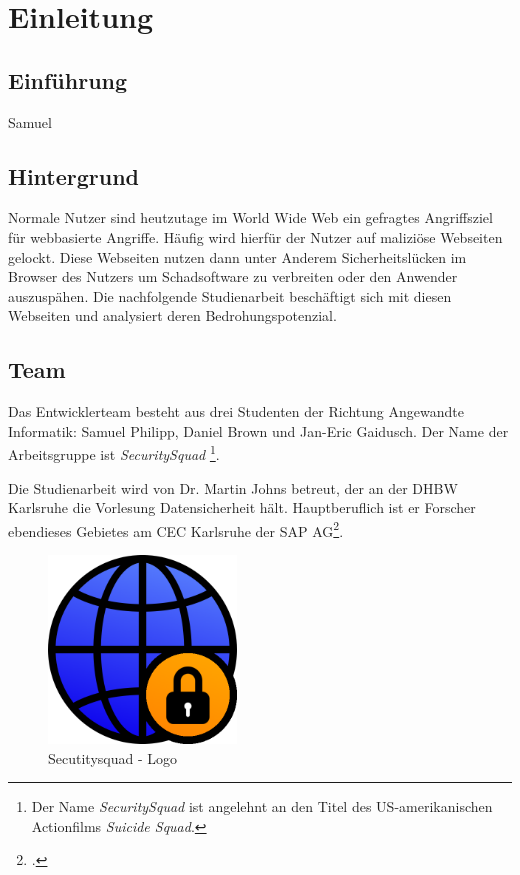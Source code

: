 \chapter{Einleitung}

\section{Einführung}

\todo Samuel

\section{Hintergrund}
Normale Nutzer sind heutzutage im World Wide Web ein gefragtes Angriffsziel für webbasierte Angriffe. Häufig wird hierfür der Nutzer auf maliziöse Webseiten gelockt. Diese Webseiten nutzen dann unter Anderem Sicherheitslücken im Browser des Nutzers um Schadsoftware zu verbreiten oder den Anwender auszuspähen. Die nachfolgende Studienarbeit beschäftigt sich mit diesen Webseiten und analysiert deren Bedrohungspotenzial.

\section{Team}
Das Entwicklerteam besteht aus drei Studenten der Richtung Angewandte Informatik:
Samuel Philipp, Daniel Brown und Jan-Eric Gaidusch.
Der Name der Arbeitsgruppe ist \textit{SecuritySquad}
\footnote{Der Name \textit{SecuritySquad} ist angelehnt an den Titel des US-amerikanischen Actionfilms \textit{Suicide Squad}.}.

Die Studienarbeit wird von Dr. Martin Johns betreut, der an der DHBW Karlsruhe die Vorlesung Datensicherheit hält. Hauptberuflich ist er Forscher ebendieses Gebietes am CEC Karlsruhe der SAP AG\footcite{johnsProfile}.

\begin{figure}[H]
  \centering
  \includegraphics[width=5cm]{images/securitysquad}
  \caption{Secutitysquad - Logo}
  \label{fig:securitysquad-logo}
\end{figure}

